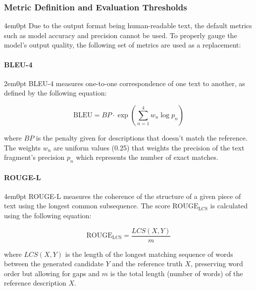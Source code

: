 		\subsubsection{Metric Definition and Evaluation Thresholds}
			\begin{indentedblock}{4em}{0pt}
				Due to the output format being human-readable text, the default metrics such as model accuracy and precision cannot be used. To properly gauge the model's output quality, the following set of metrics are used as a replacement:
			
				\paragraph{BLEU-4 \parencite{bleu_papineni}}
					\begin{indentedblock}{2em}{0pt}
						BLEU-4 measures one-to-one correspondence of one text to another, as defined by the following equation:
						
						\begin{equation}
							\text{BLEU} = BP \cdot \exp\left( \sum_{n=1}^{4} w_n \log p_n \right)
						\end{equation}
						
						where $BP$ is the penalty given for descriptions that doesn't match the reference. The weights $w_n$ are uniform values (0.25) that weights the precision of the text fragment's precision $p_n$ which represents the number of exact matches.
					\end{indentedblock}
				\paragraph{ROUGE-L \parencite{lin_rouge}}
					\begin{indentedblock}{4em}{0pt}
						ROUGE-L measures the coherence of the structure of a given piece of text using the longest common subsequence. The score $\text{ROUGE}_\text{LCS}$ is calculated using the following equation:
						
						\begin{equation}
							\text{ROUGE}_\text{LCS} = \frac{LCS(X, Y)}{m}
						\end{equation}
						
						where $LCS(X, Y)$ is the length of the longest matching sequence of words between the generated candidate $Y$ and the reference truth $X$, preserving word order but allowing for gaps and $m$ is the total length (number of words) of the reference description $X$.
					\end{indentedblock}

\end{indentedblock}
